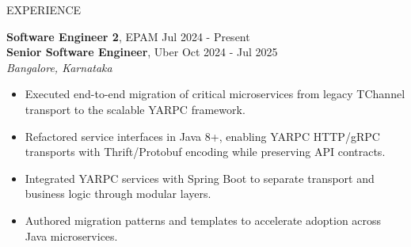 \documentclass{resume} %
\begin{document}
\begin{rSection}{EXPERIENCE}

\textbf{Software Engineer 2}, EPAM \hfill Jul 2024 - Present\\
\textbf{Senior Software Engineer}, Uber \hfill Oct 2024 - Jul 2025\\
 \hfill \textit{Bangalore, Karnataka}
 \begin{itemize}
    \itemsep -6pt
    \item Executed end-to-end migration of critical microservices from legacy TChannel transport to the scalable YARPC framework.
    \item Refactored service interfaces in Java 8+, enabling YARPC HTTP/gRPC transports with Thrift/Protobuf encoding while preserving API contracts.
    \item Integrated YARPC services with Spring Boot to separate transport and business logic through modular layers.
    \item Authored migration patterns and templates to accelerate adoption across Java microservices.
 \end{itemize}


\end{rSection}
\end{document}
